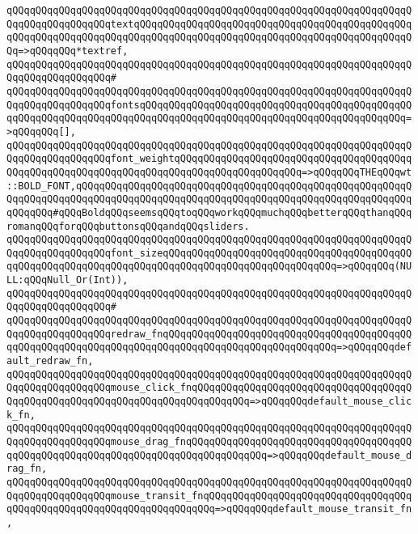 \verb|qQQqqQQqqQQqqQQqqQQqqQQqqQQqqQQqqQQqqQQqqQQqqQQqqQQqqQQqqQQqqQQqqQQqqQQqqQQqqQQqqQQqqQQqtextqQQqqQQqqQQqqQQqqQQqqQQqqQQqqQQqqQQqqQQqqQQqqQQqqQQqqQQqqQQqqQQqqQQqqQQqqQQqqQQqqQQqqQQqqQQqqQQqqQQqqQQqqQQqqQQqqQQqqQQq=>qQQqqQQq*textref,|\newline
\verb|qQQqqQQqqQQqqQQqqQQqqQQqqQQqqQQqqQQqqQQqqQQqqQQqqQQqqQQqqQQqqQQqqQQqqQQqqQQqqQQqqQQqqQQq#|\newline
\verb|qQQqqQQqqQQqqQQqqQQqqQQqqQQqqQQqqQQqqQQqqQQqqQQqqQQqqQQqqQQqqQQqqQQqqQQqqQQqqQQqqQQqqQQqfontsqQQqqQQqqQQqqQQqqQQqqQQqqQQqqQQqqQQqqQQqqQQqqQQqqQQqqQQqqQQqqQQqqQQqqQQqqQQqqQQqqQQqqQQqqQQqqQQqqQQqqQQqqQQqqQQqqQQq=>qQQqqQQq[],|\newline
\verb|qQQqqQQqqQQqqQQqqQQqqQQqqQQqqQQqqQQqqQQqqQQqqQQqqQQqqQQqqQQqqQQqqQQqqQQqqQQqqQQqqQQqqQQqfont_weightqQQqqQQqqQQqqQQqqQQqqQQqqQQqqQQqqQQqqQQqqQQqqQQqqQQqqQQqqQQqqQQqqQQqqQQqqQQqqQQqqQQqqQQqqQQq=>qQQqqQQqTHEqQQqwt::BOLD_FONT,qQQqqQQqqQQqqQQqqQQqqQQqqQQqqQQqqQQqqQQqqQQqqQQqqQQqqQQqqQQqqQQqqQQqqQQqqQQqqQQqqQQqqQQqqQQqqQQqqQQqqQQqqQQqqQQqqQQqqQQqqQQqqQQqqQQqqQQq#qQQqBoldqQQqseemsqQQqtoqQQqworkqQQqmuchqQQqbetterqQQqthanqQQqromanqQQqforqQQqbuttonsqQQqandqQQqsliders.|\newline
\verb|qQQqqQQqqQQqqQQqqQQqqQQqqQQqqQQqqQQqqQQqqQQqqQQqqQQqqQQqqQQqqQQqqQQqqQQqqQQqqQQqqQQqqQQqfont_sizeqQQqqQQqqQQqqQQqqQQqqQQqqQQqqQQqqQQqqQQqqQQqqQQqqQQqqQQqqQQqqQQqqQQqqQQqqQQqqQQqqQQqqQQqqQQqqQQqqQQq=>qQQqqQQq(NULL:qQQqNull_Or(Int)),|\newline
\verb|qQQqqQQqqQQqqQQqqQQqqQQqqQQqqQQqqQQqqQQqqQQqqQQqqQQqqQQqqQQqqQQqqQQqqQQqqQQqqQQqqQQqqQQq#|\newline
\verb|qQQqqQQqqQQqqQQqqQQqqQQqqQQqqQQqqQQqqQQqqQQqqQQqqQQqqQQqqQQqqQQqqQQqqQQqqQQqqQQqqQQqqQQqredraw_fnqQQqqQQqqQQqqQQqqQQqqQQqqQQqqQQqqQQqqQQqqQQqqQQqqQQqqQQqqQQqqQQqqQQqqQQqqQQqqQQqqQQqqQQqqQQqqQQqqQQq=>qQQqqQQqdefault_redraw_fn,|\newline
\verb|qQQqqQQqqQQqqQQqqQQqqQQqqQQqqQQqqQQqqQQqqQQqqQQqqQQqqQQqqQQqqQQqqQQqqQQqqQQqqQQqqQQqqQQqmouse_click_fnqQQqqQQqqQQqqQQqqQQqqQQqqQQqqQQqqQQqqQQqqQQqqQQqqQQqqQQqqQQqqQQqqQQqqQQqqQQqqQQq=>qQQqqQQqdefault_mouse_click_fn,|\newline
\verb|qQQqqQQqqQQqqQQqqQQqqQQqqQQqqQQqqQQqqQQqqQQqqQQqqQQqqQQqqQQqqQQqqQQqqQQqqQQqqQQqqQQqqQQqmouse_drag_fnqQQqqQQqqQQqqQQqqQQqqQQqqQQqqQQqqQQqqQQqqQQqqQQqqQQqqQQqqQQqqQQqqQQqqQQqqQQqqQQqqQQq=>qQQqqQQqdefault_mouse_drag_fn,|\newline
\verb|qQQqqQQqqQQqqQQqqQQqqQQqqQQqqQQqqQQqqQQqqQQqqQQqqQQqqQQqqQQqqQQqqQQqqQQqqQQqqQQqqQQqqQQqmouse_transit_fnqQQqqQQqqQQqqQQqqQQqqQQqqQQqqQQqqQQqqQQqqQQqqQQqqQQqqQQqqQQqqQQqqQQqqQQq=>qQQqqQQqdefault_mouse_transit_fn,|\newline
